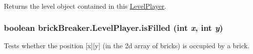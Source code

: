 \label{classbrick_breaker_1_1_level_player_a732aa75e9304df978a19452b95b6ee87}
Returns the level object contained in this \hyperlink{classbrick_breaker_1_1_level_player}{LevelPlayer}. \hypertarget{classbrick_breaker_1_1_level_player_a298ae45b06799f0299d4b518075b9599}{
\subsubsection[{isFilled}]{\setlength{\rightskip}{0pt plus 5cm}boolean brickBreaker.LevelPlayer.isFilled (int {\em x}, \/  int {\em y})}}
\label{classbrick_breaker_1_1_level_player_a298ae45b06799f0299d4b518075b9599}
Tests whether the position \mbox{[}x\mbox{]}\mbox{[}y\mbox{]} (in the 2d array of bricks) is occupied by a brick.


